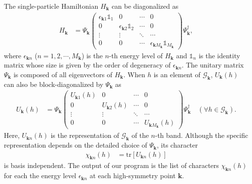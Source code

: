 \documentclass[3p,preprint]{elsarticle}
\newcommand{\calG}{\mathcal{G}}
\newcommand{\calGk}{\mathcal{G}_{\bm{k}}}
\newcommand{\vk}{\bm{k}}
\begin{document}
The single-particle Hamiltonian $H_{\vk}$ can be diagonalized as
\begin{align}
\label{eq:Ham_TB_2}
H_{\vk} &= \Psi_{\vk}
\begin{pmatrix}
\epsilon_{\vk1}\mathds{1}_{1} & 0 & \cdots & 0 \\
0 &  \epsilon_{\vk2}\mathds{1}_{2}  & \cdots & 0 \\
\vdots & \vdots & \ddots & \cdots \\
0 & 0 & \cdots & \epsilon_{ \vk M_{\vk}}\mathds{1}_{M_{\vk}}
\end{pmatrix}\Psi_{\vk}^{\dagger},
\end{align}
where $\epsilon_{\vk n}$ ($n=1,2,\cdots,M_{\vk}$) is the $n$-th energy level of $H_{\vk}$ and $\mathds{1}_{n}$ is the identity matrix whose size is given by the order of degeneracy of $\epsilon_{\vk n}$.  The unitary matrix $\Psi_{\vk}$ is composed of all eigenvectors of $H_{\vk}$.  
When $h$ is an element of $\calGk$, $U_{\vk}(h)$ can also be block-diagonalized by $\Psi_{\vk}$ as
\begin{align}
\label{eq:Rep_TB}
U_{\vk}(h) &= \Psi_{\vk}
\begin{pmatrix}
U_{\vk1}(h) & 0 & \cdots & 0 \\
0 &  U_{\vk2}(h) & \cdots & 0 \\
\vdots & \vdots & \ddots & \cdots \\
0 & 0 & \cdots & U_{\vk M_{\vk}}(h) 
\end{pmatrix}\Psi_{\vk}^{\dagger} \quad \left(\forall h \in \calG_{\vk}\right).
\end{align}
Here, $U_{\vk n}(h)$ is the representation of $\calGk$ of the $n$-th band. Although the specific representation depends on the detailed choice of $\Psi_{\vk}$, its character 
\begin{align}
\chi_{\vk n}(h) &= \mathrm{tr}\left[U_{\vk n}(h) \right]
\end{align}
is basis independent.  The output of our program is the list of characters $\chi_{\vk n}(h)$ for each the energy level $\epsilon_{\vk n}$ at each high-symmetry point $\vk$.  
\end{document}
